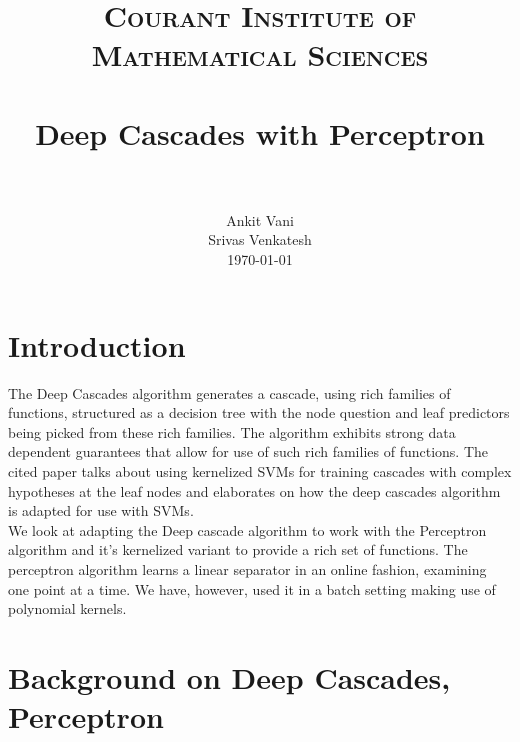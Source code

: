 \documentclass[paper=letter, fontsize=11pt]{scrartcl}
\title{
		\usefont{OT1}{bch}{b}{n}
		\normalfont \normalsize \textsc{Courant Institute of Mathematical Sciences} \\ [25pt]
		\horrule{0.5pt} \\[0.4cm]
		\huge Deep Cascades with Perceptron \\
		\horrule{2pt} \\[0.5cm]
}
\author{
		\normalfont 								\normalsize
        Ankit Vani\\ \normalsize Srivas Venkatesh\\[-3pt]		\normalsize
        \today
}
\date{}
\numberwithin{equation}{section}		%
\numberwithin{figure}{section}			%
\numberwithin{table}{section}				%
\begin{document}
\maketitle
\section{Introduction}

The Deep Cascades \cite{deepcascades} algorithm generates a cascade, using rich families of functions, structured as a decision tree with the node question and leaf predictors being picked from these rich families. The algorithm exhibits strong data dependent guarantees that allow for use of such rich families of functions. The cited paper talks about using kernelized SVMs for training cascades with complex hypotheses at the leaf nodes and elaborates on how the deep cascades algorithm is adapted for use with SVMs.
\\We look at adapting the Deep cascade algorithm to work with the Perceptron algorithm \cite{rosenblatt1958perceptron} and it's kernelized variant \cite{kernelizedperceptron} to provide a rich set of functions. The perceptron algorithm learns a linear separator in an online fashion, examining one point at a time. We have, however, used it in a batch setting making use of polynomial kernels.
\section{Background on Deep Cascades, Perceptron}
\end{document}
